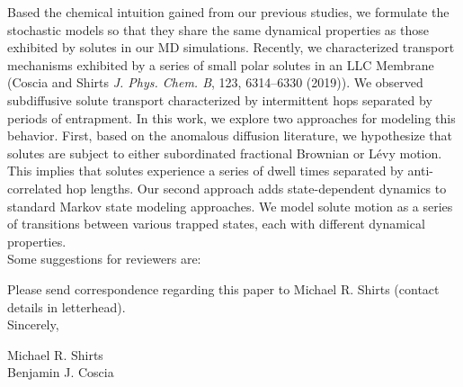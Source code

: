 \documentclass[fontsize=11pt]{article}
\begin{document}
	Based the chemical intuition gained from our previous studies, we
	formulate the stochastic models so that they share the same dynamical
	properties as those exhibited by solutes in our MD simulations. 
	Recently, we characterized transport mechanisms exhibited by a series
	of small polar solutes in an LLC Membrane (Coscia and Shirts \textit{J.
	Phys. Chem. B}, 123, 6314--6330 (2019)). We observed subdiffusive
	solute transport characterized by intermittent hops separated by
	periods of entrapment. 
	In this work, we explore two approaches for modeling this behavior.
	First, based on the anomalous diffusion literature, we hypothesize that
	solutes are subject to either subordinated fractional Brownian or
	L\'evy motion. This implies that solutes experience a series of dwell
	times separated by anti-correlated hop lengths. Our second approach
	adds state-dependent dynamics to standard Markov state modeling
	approaches. We model solute motion as a series of transitions between
	various trapped states, each with different dynamical properties. \\
	
	\noindent Some suggestions for reviewers are:
	
	\noindent Please send correspondence regarding this paper to Michael R. Shirts (contact
	details in letterhead).\\	
	
	\noindent Sincerely,
	
	\noindent Michael R. Shirts \\
	\noindent Benjamin J. Coscia \\
	
\end{document}
